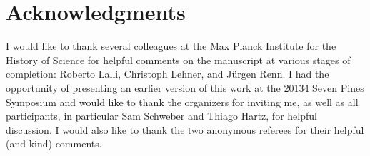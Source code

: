 \documentclass[12pt]{article}
\begin{document}
\section{Acknowledgments}
I would like to thank several colleagues at the Max Planck Institute for the History of Science for helpful comments on the manuscript at various stages of completion: Roberto Lalli, Christoph Lehner, and J\"{u}rgen Renn. I had the opportunity of presenting an earlier version of this work at the 20134 Seven Pines Symposium and would like to thank the organizers for inviting me, as well as all participants, in particular Sam Schweber and Thiago Hartz, for helpful discussion. I would also like to thank the two anonymous referees for their helpful (and kind) comments. 





\end{document}
